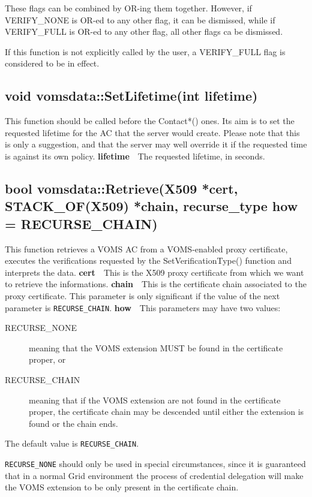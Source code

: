 \documentclass[a4paper]{book}
\newcommand{\parameter}[2]{\newline\textbf{#1}\ \ #2}
\begin{document}
These flags can be combined by OR-ing them together.  However, if
VERIFY\_NONE is OR-ed to any other flag, it can be dismissed, while if
VERIFY\_FULL is OR-ed to any other flag, all other flags ca be
dismissed.

If this function is not explicitly called by the user, a VERIFY\_FULL
flag is considered to be in effect.


\subsection{void vomsdata::SetLifetime(int lifetime)}

This function should be called before the Contact*() ones.  Its aim is
to set the requested lifetime for the AC that the server would
create.  Please note that this is only a suggestion, and that the
server may well override it if the requested time is against its own
policy.
\parameter{lifetime}{The requested lifetime, in seconds.}

\subsection{bool vomsdata::Retrieve(X509 *cert, STACK\_OF(X509) *chain, recurse\_type how = RECURSE\_CHAIN)}\label{ret}

This function retrieves a VOMS AC from a VOMS-enabled proxy
certificate, executes the verifications requested by the
SetVerificationType() function and interprets the data.
\parameter{cert}{This is the X509 proxy certificate from which we want to
retrieve the informations.}
\parameter{chain}{This is the certificate chain associated to the proxy
certificate.  This parameter is only significant if the value of the
next parameter is \texttt{RECURSE\_CHAIN}.}
\parameter{how}{This parameters may have two values:
\begin{description}
\item[RECURSE\_NONE] meaning that the VOMS extension MUST be found in
  the certificate proper, or
\item[RECURSE\_CHAIN] meaning that if the VOMS extension are not found
  in the certificate proper, the certificate chain may be descended
  until either the extension is found or the chain ends.
\end{description}
The default value is \texttt{RECURSE\_CHAIN}.}

\texttt{RECURSE\_NONE} should only be used in special circumstances,
since it is guaranteed that in a normal Grid environment the process
of credential delegation will make the VOMS extension to be only
present in the certificate chain.
\end{document}
